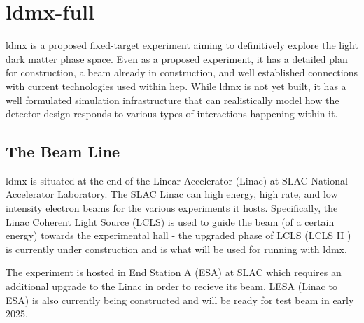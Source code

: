 \chapter{\gls{ldmx-full}}
\label{chapter:ldmx:experiment}

\gls{ldmx} is a proposed fixed-target experiment aiming to definitively explore
the light dark matter phase space. Even as a proposed experiment, it has a detailed
plan for construction, a beam already in construction, and well established connections
with current technologies used within \gls{hep}. While \gls{ldmx} is not yet built,
it has a well formulated simulation infrastructure that can realistically model
how the detector design responds to various types of interactions happening within it.

\section{The Beam Line}
\gls{ldmx} is situated at the end of the Linear Accelerator (Linac) at SLAC National Accelerator
Laboratory. The SLAC Linac can high energy, high rate, and low intensity electron beams for
the various experiments it hosts. Specifically, the Linac Coherent Light Source (LCLS) is
used to guide the beam (of a certain energy) towards the experimental hall - the upgraded
phase of LCLS (LCLS II \cite{lcls-ii}) is currently under construction and is what will
be used for running with \gls{ldmx}.

The experiment is hosted in End Station A (ESA) at SLAC which requires an additional
upgrade to the Linac in order to recieve its beam. LESA (Linac to ESA) \cite{lesa-design}
is also currently being constructed and will be ready for test beam in early 2025.

